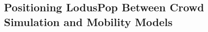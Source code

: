 \documentclass[pdflatex,sn-mathphys-num]{sn-jnl}%
\newcommand\red[1]{#1}
\theoremstyle{thmstyleone}%
\theoremstyle{thmstyletwo}%
\theoremstyle{thmstylethree}%
\begin{document}

\subsection{Positioning LodusPop Between Crowd Simulation and Mobility Models}
\end{document}

